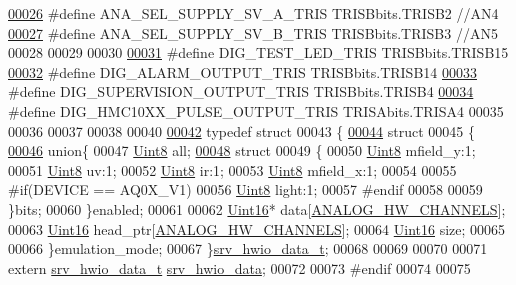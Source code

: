 \begin{DoxyCode}
\hypertarget{a00034_source_l00026}{}\hyperlink{a00034_a202b949551441c2047a818fb1fcb4520}{00026} \textcolor{preprocessor}{#define ANA\_SEL\_SUPPLY\_SV\_A\_TRIS            TRISBbits.TRISB2    //AN4}
\hypertarget{a00034_source_l00027}{}\hyperlink{a00034_afe07f742315c811d8986bb790d3027f4}{00027} \textcolor{preprocessor}{#define ANA\_SEL\_SUPPLY\_SV\_B\_TRIS            TRISBbits.TRISB3    //AN5}
00028 
00029 
00030 
\hypertarget{a00034_source_l00031}{}\hyperlink{a00034_af8b26b4b9327a36f53d2d9acdec6d6c1}{00031} \textcolor{preprocessor}{#define DIG\_TEST\_LED\_TRIS                   TRISBbits.TRISB15}
\hypertarget{a00034_source_l00032}{}\hyperlink{a00034_a65c85b1d486b314430cd3a5b77ab84c3}{00032} \textcolor{preprocessor}{#define DIG\_ALARM\_OUTPUT\_TRIS               TRISBbits.TRISB14}
\hypertarget{a00034_source_l00033}{}\hyperlink{a00034_a5459e774c229eaef3db4a6dc3b3d13c2}{00033} \textcolor{preprocessor}{#define DIG\_SUPERVISION\_OUTPUT\_TRIS         TRISBbits.TRISB4}
\hypertarget{a00034_source_l00034}{}\hyperlink{a00034_ab1c495ea3dba84156038b314588146b5}{00034} \textcolor{preprocessor}{#define DIG\_HMC10XX\_PULSE\_OUTPUT\_TRIS       TRISAbits.TRISA4}
00035 
00036 
00037 
00038 
00040 
\hypertarget{a00034_source_l00042}{}\hyperlink{a00034}{00042} \textcolor{keyword}{typedef} \textcolor{keyword}{struct}
00043 \{
\hypertarget{a00034_source_l00044}{}\hyperlink{a00034}{00044}           \textcolor{keyword}{struct}
00045         \{
\hypertarget{a00034_source_l00046}{}\hyperlink{a00034}{00046}             \textcolor{keyword}{union}\{
00047                 \hyperlink{a00072_af84840501dec18061d18a68c162a8fa2}{Uint8} all;
\hypertarget{a00034_source_l00048}{}\hyperlink{a00034}{00048}                  \textcolor{keyword}{struct}
00049                 \{
00050                      \hyperlink{a00072_af84840501dec18061d18a68c162a8fa2}{Uint8} mfield\_y:1;
00051                  \hyperlink{a00072_af84840501dec18061d18a68c162a8fa2}{Uint8} uv:1;
00052                  \hyperlink{a00072_af84840501dec18061d18a68c162a8fa2}{Uint8} ir:1;
00053                      \hyperlink{a00072_af84840501dec18061d18a68c162a8fa2}{Uint8} mfield\_x:1;
00054                      
00055 \textcolor{preprocessor}{                     #if(DEVICE == AQ0X\_V1)}
00056                      \hyperlink{a00072_af84840501dec18061d18a68c162a8fa2}{Uint8} light:1;
00057 \textcolor{preprocessor}{                     #endif}
00058                      
00059                 \}bits;
00060             \}enabled;
00061 
00062             \hyperlink{a00072_a59a9f6be4562c327cbfb4f7e8e18f08b}{Uint16}*    data[\hyperlink{a00034_ab6ea71f43c4869429695d697be882efe}{ANALOG\_HW\_CHANNELS}];
00063             \hyperlink{a00072_a59a9f6be4562c327cbfb4f7e8e18f08b}{Uint16}     head\_ptr[\hyperlink{a00034_ab6ea71f43c4869429695d697be882efe}{ANALOG\_HW\_CHANNELS}];
00064             \hyperlink{a00072_a59a9f6be4562c327cbfb4f7e8e18f08b}{Uint16}     size;
00065 
00066         \}emulation\_mode;
00067 \}\hyperlink{a00034_dc/d0c/a00783}{srv\_hwio\_data\_t};
00068 
00069 
00070 
00071 \textcolor{keyword}{extern}  \hyperlink{a00034_dc/d0c/a00783}{srv\_hwio\_data\_t}                         \hyperlink{a00034_a0fd91014631926f362c7c2b2f5d143b0}{srv\_hwio\_data};
00072 
00073 \textcolor{preprocessor}{#endif}
00074 
00075 
\end{DoxyCode}
